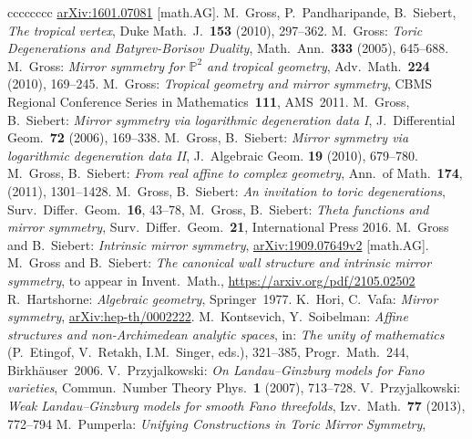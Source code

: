 \documentclass[11pt,letter]{amsart}
\theoremstyle{definition}
\theoremstyle{remark}
\numberwithin{equation}{section}
\numberwithin{figure}{section}
\newcommand{\PP} {\mathbb{P}}
\begin{document}
\begin{thebibliography}{cccccccc}
	\href{https://arxiv.org/pdf/1601.07081}{arXiv:1601.07081} [math.AG].
 M.\ Gross, P.\ Pandharipande, B.\ Siebert,
	\emph{The tropical vertex},
	Duke Math.\ J.\ \textbf{153} (2010), 297--362.
 M.~Gross:
	\emph{Toric Degenerations and Batyrev-Borisov Duality},
	Math.\ Ann.\ \textbf{333} (2005), 645--688.
 M.\ Gross:
	\emph{Mirror symmetry for $\PP^2$ and tropical geometry},
	Adv.~Math.\ {\bf 224} (2010), 169--245.
 M.\ Gross:
	\emph{Tropical geometry and mirror symmetry},
	CBMS Regional Conference Series in Mathematics~\textbf{111},
	AMS~2011.
 M.\ Gross, B.\ Siebert:
	\emph{Mirror symmetry via logarithmic degeneration data I},
	J.\ Differential Geom.~\textbf{72} (2006), 169--338.
 M.\ Gross, B.\ Siebert:
	\emph{Mirror symmetry via logarithmic degeneration data II},
	J.\ Algebraic Geom. \textbf{19} (2010), 679--780.
 M.\ Gross, B.\ Siebert:
	\emph{From real affine to complex geometry},
	Ann.\ of Math.~\textbf{174}, (2011), 1301--1428.
 M.\ Gross, B.\ Siebert:
	\emph{An invitation to toric degenerations},
	Surv.\ Differ.\ Geom.~\textbf{16}, 43--78,
 M.\ Gross, B.\ Siebert:
	\emph{Theta functions and mirror symmetry},
	Surv.\ Differ.\ Geom.~\textbf{21}, International Press 2016.
 M.~Gross and B.~Siebert:
	\emph{Intrinsic mirror symmetry},
	\href{https://arxiv.org/pdf/1909.07649v2}{arXiv:1909.07649v2} [math.AG].
 M.~Gross and B.~Siebert:
	\emph{The canonical wall structure and intrinsic mirror symmetry},
	to appear in Invent.\ Math.,
	\href{https://arxiv.org/pdf/2105.02502}{https://arxiv.org/pdf/2105.02502}
 R.\ Hartshorne:
	\emph{Algebraic geometry},
	Springer~1977.
 K.\ Hori, C.\ Vafa:
	\emph{Mirror symmetry},
	\href{https://arxiv.org/pdf/hep-th/0002222}{arXiv:hep-th/0002222}.
 M.\ Kontsevich, Y.\ Soibelman:
	\emph{Affine structures and non-Archimedean analytic spaces}, in:
	\textsl{The unity of mathematics} (P.~Etingof, V.~Retakh,
	I.M.~Singer, eds.),  321--385, Progr.\ Math.~244,
	Birkh\"auser~2006.
 V.\ Przyjalkowski:
	\emph{On Landau--Ginzburg models for Fano varieties},
 	Commun.\ Number Theory Phys.~\textbf{1} (2007), 713--728. 
 V.\ Przyjalkowski:
	\emph{ Weak Landau--Ginzburg models for smooth Fano threefolds},
	Izv.\ Math.~\textbf{77} (2013), 772--794
 M.\ Pumperla:
	\emph{Unifying Constructions in Toric Mirror Symmetry},

\end{thebibliography}
\end{document}
